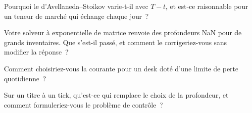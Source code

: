 \begin{interviewq}\label{iq:hf:inventory-models:3}
Pourquoi le  d'Avellaneda--Stoikov varie-t-il avec $T-t$, et est-ce raisonnable pour un teneur de marché qui échange chaque jour~?
\end{interviewq}

\begin{interviewq}\label{iq:hf:inventory-models:4}
Votre solveur à exponentielle de matrice renvoie des profondeurs NaN pour de grands inventaires. Que s'est-il passé, et comment le corrigeriez-vous sans modifier la réponse~?
\end{interviewq}

\begin{interviewq}\label{iq:hf:inventory-models:5}
Comment choisiriez-vous la  courante pour un desk doté d'une limite de perte quotidienne~?
\end{interviewq}

\begin{interviewq}\label{iq:hf:inventory-models:6}
Sur un titre à un tick, qu'est-ce qui remplace le choix de la profondeur, et comment formuleriez-vous le problème de contrôle~?
\end{interviewq}
